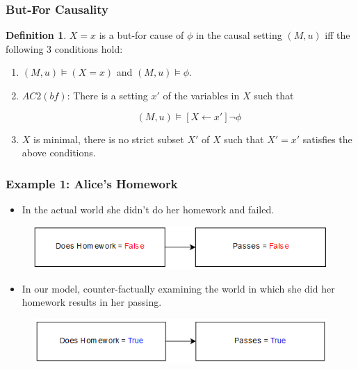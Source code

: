 \documentclass{beamer}
\theoremstyle{plain}
\theoremstyle{definition}
\newtheorem{defn}[thm]{Definition} %
\begin{document}
\begin{frame}
\frametitle{But-For Causality}

\begin{defn}$X=x$ is a but-for cause of $\phi$ in the causal setting $(M,u)$ iff the following 3 conditions hold:
\begin{enumerate}
\item $(M,u) \models (X=x)$ and $(M,u) \models \phi$.
\item $AC2(bf)$: There is a setting $x'$ of the variables in $X$ such that

\[
(M,u) \models [X\leftarrow x']\lnot \phi
\] 

\item $X$ is minimal, there is no strict subset $X'$ of $X$ such that $X' = x'$ satisfies the above conditions.
\end{enumerate}

\end{defn}

\end{frame}


\begin{frame}
\frametitle{Example 1: Alice's Homework}

\begin{itemize}
\item In the actual world she didn't do her homework and failed.
\end{itemize}
\begin{figure}
\includegraphics[scale=.4]{aliceModelReal}
\end{figure}


\begin{itemize}
\item In our model, counter-factually examining the world in which she did her homework results in her passing.
\end{itemize}
\begin{figure}
\includegraphics[scale=.4]{aliceModelCounterfactual}
\end{figure}

\end{frame}
\end{document}
